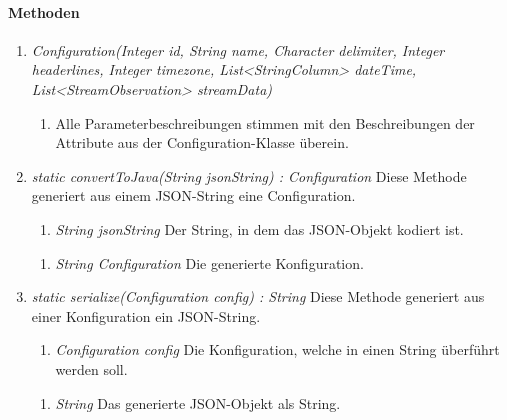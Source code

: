 \paragraph{Methoden}
\begin{enumerate}[+]
	\item \textit{Configuration(Integer id, String name, Character delimiter, Integer headerlines, Integer timezone, List<StringColumn> dateTime, List<StreamObservation> streamData)}
	\begin{enumerate}[$\bullet$]
		\item Alle Parameterbeschreibungen stimmen mit den Beschreibungen der Attribute aus der Configuration-Klasse überein.
	\end{enumerate}

	\item \textit{static convertToJava(String jsonString) : Configuration} Diese Methode generiert aus einem JSON-String eine Configuration.
	\begin{enumerate}[$\bullet$]
		\item \textit{String jsonString} Der String, in dem das JSON-Objekt kodiert ist.
	\end{enumerate}
	\begin{enumerate}[$\circ$]
		\item \textit{String Configuration} Die generierte Konfiguration.
	\end{enumerate}
	
	\item \textit{static serialize(Configuration config) : String} Diese Methode generiert aus einer Konfiguration ein JSON-String.
	\begin{enumerate}[$\bullet$]
		\item \textit{Configuration config} Die Konfiguration, welche in einen String überführt werden soll.
	\end{enumerate}
	\begin{enumerate}[$\circ$]
		\item \textit{String} Das generierte JSON-Objekt als String.
	\end{enumerate}
\end{enumerate}

